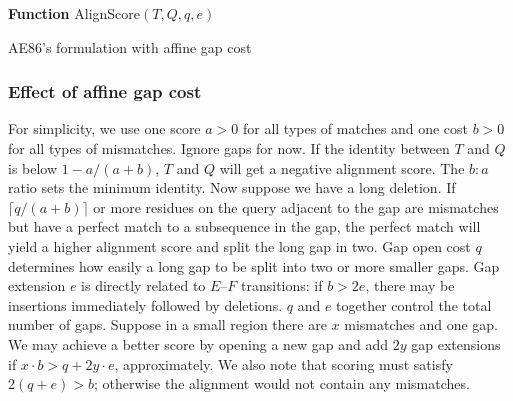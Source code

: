\documentclass{bioinfo}
\begin{document}
\begin{methods}
\begin{algorithm}[tb]
\DontPrintSemicolon
\footnotesize
{}
\BlankLine
\textbf{Function} {\sc AlignScore}$(T,Q,q,e)$
\caption{AE86's formulation with affine gap cost}\label{algo:ae86}
\end{algorithm}

\subsubsection{Effect of affine gap cost}\label{sec:affine-eff}

For simplicity, we use one score $a>0$ for all types of matches and one cost
$b>0$ for all types of mismatches. Ignore gaps for now. If the identity between
$T$ and $Q$ is below $1-a/(a+b)$, $T$ and $Q$ will get a negative alignment
score. The $b:a$ ratio sets the minimum identity. Now suppose we have a long
deletion. If $\lceil q/(a+b)\rceil$ or more residues on the query adjacent to
the gap are mismatches but have a perfect match to a subsequence in the gap,
the perfect match will yield a higher alignment score and split the long gap in
two. Gap open cost $q$ determines how easily a long gap to be split into two or
more smaller gaps. Gap extension $e$ is directly related to $E$--$F$
transitions: if $b>2e$, there may be insertions immediately followed by
deletions. $q$ and $e$ together control the total number of gaps. Suppose in a
small region there are $x$ mismatches and one gap. We may achieve a better
score by opening a new gap and add $2y$ gap extensions if $x\cdot b>q+2y\cdot
e$, approximately. We also note that scoring must satisfy $2(q+e)>b$; otherwise
the alignment would not contain any mismatches.


\end{methods}
\end{document}
